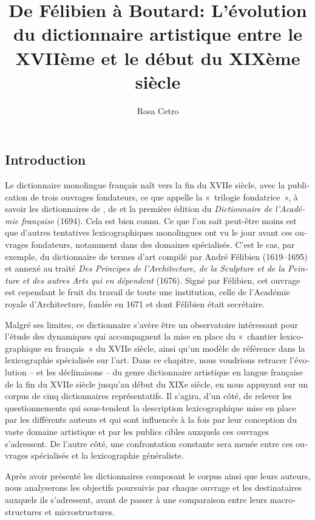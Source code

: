 \documentclass[output=paper,colorlinks,citecolor=brown,arabicfont,chinesefont,booklanguage=french]{langscibook}
\author{Rosa Cetro\affiliation{Université de Pise / PLIDAM, INALCO}}
\title[De Félibien à Boutard]{De Félibien à Boutard: L’évolution du dictionnaire artistique entre le XVIIème et le début du XIXème siècle}
\begin{document}
\begin{otherlanguage}{french}
\maketitle

\section{Introduction}

Le dictionnaire monolingue français naît vers la fin du XVIIe siècle, avec la publication de trois ouvrages fondateurs, ce que \citet[463]{Pruvost2003} appelle la «~trilogie fondatrice~», à savoir les dictionnaires de \citet{Richelet1680}, de \citet{Furetière1690} et la première édition du \emph{Dictionnaire de l’Académie française} (1694). Cela est bien connu. Ce que l’on sait peut-être moins est que d’autres tentatives lexicographiques monolingues ont vu le jour avant ces ouvrages fondateurs, notamment dans des domaines spécialisés. C’est le cas, par exemple, du dictionnaire de termes d’art compilé par André Félibien (1619--1695) et annexé au traité \emph{Des Principes de l’Architecture, de la Sculpture et de la Peinture et des autres Arts qui en dépendent} (1676). Signé par Félibien, cet ouvrage est cependant le fruit du travail de toute une institution, celle de l’Académie royale d’Architecture, fondée en 1671 et dont Félibien était secrétaire.

Malgré ses limites, ce dictionnaire s’avère être un observatoire intéressant pour l’étude des dynamiques qui accompagnent la mise en place du «~chantier lexicographique en français~» du XVIIe siècle, ainsi qu’un modèle de référence dans la lexicographie spécialisée sur l’art. Dans ce chapitre, nous voudrions retracer l’évolution – et les déclinaisons – du genre dictionnaire artistique en langue française de la fin du XVIIe siècle jusqu’au début du XIXe siècle, en nous appuyant sur un corpus de cinq dictionnaires représentatifs. Il s’agira, d’un côté, de relever les questionnements qui sous-tendent la description lexicographique mise en place par les différents auteurs et qui sont influencés à la fois par leur conception du vaste domaine artistique et par les publics cibles auxquels ces ouvrages s’adressent. De l’autre côté, une confrontation constante sera menée entre ces ouvrages spécialisés et la lexicographie généraliste.

Après avoir présenté les dictionnaires composant le corpus ainsi que leurs auteurs, nous analyserons les objectifs poursuivis par chaque ouvrage et les destinataires auxquels ils s’adressent, avant de passer à une comparaison entre leurs macrostructures et microstructures.


\end{otherlanguage}
\end{document}
